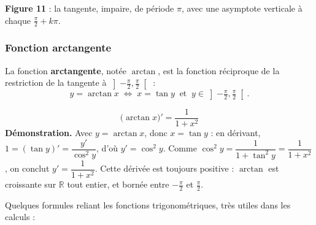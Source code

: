 \documentclass[11pt,a4paper]{article}
\newcommand{\R}{\mathbb{R}}
\begin{document}
\begin{center}
\textbf{\textcolor{primary}{Figure 11}} : la tangente, impaire, de période $\pi$, avec une
asymptote verticale à chaque $\frac{\pi}{2}+k\pi$.
\end{center}

\subsubsection{Fonction arctangente}

\begin{definition}
La fonction \textbf{arctangente}, notée $\arctan$, est la fonction réciproque de la
restriction de la tangente à $\left]-\tfrac{\pi}{2},\tfrac{\pi}{2}\right[$ :
\[
  y=\arctan x \;\Longleftrightarrow\; x=\tan y \ \text{ et } \ y\in\left]-\tfrac{\pi}{2},\tfrac{\pi}{2}\right[.
\]
\end{definition}

\begin{formule}
\[
  \boxed{\;\big(\arctan x\big)'=\dfrac{1}{1+x^2}\;}
\]
\textbf{Démonstration.} Avec $y=\arctan x$, donc $x=\tan y$ : en dérivant,
$1=(\tan y)'=\dfrac{y'}{\cos^2 y}$, d'où $y'=\cos^2 y$. Comme
$\cos^2 y=\dfrac{1}{1+\tan^2 y}=\dfrac{1}{1+x^2}$, on conclut
$y'=\dfrac{1}{1+x^2}$. Cette dérivée est toujours positive : $\arctan$ est croissante
sur $\R$ tout entier, et bornée entre $-\tfrac{\pi}{2}$ et $\tfrac{\pi}{2}$.
\end{formule}

\begin{remarque}
Quelques formules reliant les fonctions trigonométriques, très utiles dans les calculs :
\end{remarque}
\end{document}
